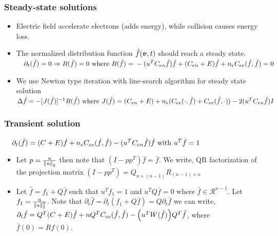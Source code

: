 \documentclass[landscape,archE,fontscale=0.285]{baposter} %
\begin{document}
\begin{poster}
{\begin{multicols}{2}
		\subsubsection*{Steady-state solutions}
		\begin{itemize}
			\item Electric field accelerate electrons (adds energy), while collision causes energy loss.
			\columnbreak
			\item The normalized distribution function $\hat{f}\of{\vect{v},t}$ should reach a steady state.
			$
			 \displaystyle
			 \quad
			 \partial_t (\hat{f}) = 0 \Rightarrow R(\hat{f}) = 0 \text{ where } R(\hat{f}) =\\
			 \footnotesize
			 -(u^T C_{en} \hat{f}) \hat{f} + (C_{en}+E)\hat{f} + n_e C_{ee}(\hat{f}, \hat{f}) =0
			$
			\item We use Newton type iteration with line-search algorithm for steady state solution
			$
			\Delta\hat{f} = -[J(\hat{f})]^{-1}R(\hat{f}) \text{ where } \\
			J(\hat{f}) = (C_{en} + E) + n_e (C_{ee}(\cdot, \hat{f}) + C_{ee}(\hat{f}, \cdot)) \\
			-2(u^T C_{en} \hat{f})I
			$
		\end{itemize}
		\vspace{-0.6in}
		\subsubsection*{Transient solution}
			$
			\displaystyle
			\quad
			\partial_t (\hat{f}) = (C+E)\hat{f} + n_e C_{ee}(\hat{f}, \hat{f}) -(u^T C_{en} \hat{f}) \hat{f} \\
			\text{ with } u^T \hat{f} =1
			$
			\begin{itemize}
				\item  Let $p = \frac{u}{\left\lVert u\right\rVert_2}$ then note that $(I-pp^T)\bar{f} = \bar{f}$. We write, QR factorization of the projection matrix $(I-pp^T) = Q_{n\times (n-1)} R_{(n-1)\times n}$
				\item Let $\hat{f} = f_1 + Q\bar{f}$ such that $u^T f_1 = 1$ and $u^T Q\bar{f}=0$ where $\bar{f}\in \mathcal{R}^{n-1}$.  Let $f_1= \frac{u}{\left\lVert u\right\rVert_2^2}$. Note that $\partial_t \hat{f} = \partial_t (f_1 + Q\bar{f} ) = Q\partial_t \bar{f}$ we can write, 
				$
					\partial_t \bar{f} = Q^T(C+E)\hat{f} + n Q^T C_{ee}(\hat{f}, \hat{f}) \\
					- \of{u^T W(\hat{f})} Q^T\hat{f}
				$, where $\bar{f}(0) = Rf(0)$.
			\end{itemize}
	\end{multicols}
}


\end{poster}
\end{document}
